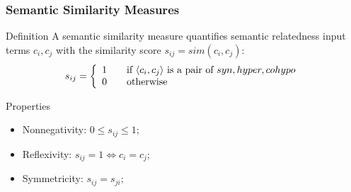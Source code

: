 \begin{frame}
\frametitle{Semantic Similarity Measures}



\begin{block}{Definition}
  A semantic similarity measure quantifies semantic relatedness input terms $c_i, c_j$ with the similarity score $s_{ij} = sim(c_i,c_j)$:
    $$
  s_{ij} = \left\{ 
   \begin{array}{l l}
     1 & \quad \text{if } \langle c_i, c_j \rangle \text{ is a pair of } syn, hyper, cohypo \\
    0 & \quad \text{otherwise}\\
   \end{array} \right.
 $$
 \end{block}


\begin{block}{Properties}
\begin{itemize}    
  \item Nonnegativity: $0 \leq s_{ij} \leq 1$;
  \item Reflexivity: $s_{ij} = 1 \Leftrightarrow c_i = c_j$;
  \item Symmetricity: $s_{ij} = s_{ji}$;
  \end{itemize}
 \end{block}
     
\end{frame}







